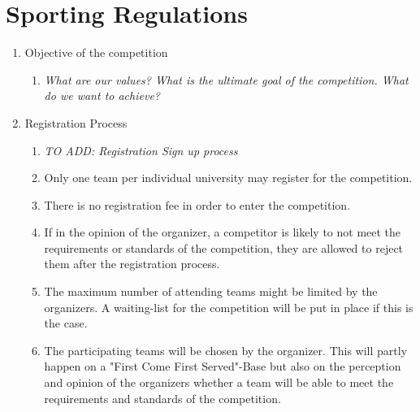 
\chapter{Sporting Regulations}\label{chapter:Sporting Regulations}

\begin{enumerate}
  \item{Objective of the competition}
    \begin{enumerate}
      \item \emph{What are our values? What is the ultimate goal of the competition. What do we want to achieve?}
    \end{enumerate}


  \item{Registration Process}
    \begin{enumerate}
      \item \emph{TO ADD: Registration Sign up process}
      \item Only one team per individual university may register for the competition.  
      \item There is no registration fee in order to enter the competition. 
      \item If in the opinion of the organizer, a competitor is likely to not meet the requirements or standards
      of the competition, they are allowed to reject them after the registration process. 
      \item The maximum number of attending teams might be limited by the organizers. A waiting-list for the competition
      will be put in place if this is the case. 
      \item The participating teams will be chosen by the organizer. This will partly happen on a "First Come First Served"-Base but also
      on the perception and opinion of the organizers whether a team will be able to meet the requirements and standards of the competition. 
    \end{enumerate}


\end{enumerate}

